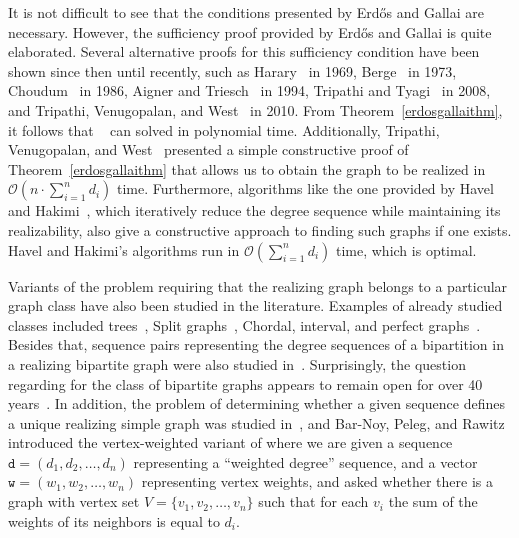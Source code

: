 It is not difficult to see that the conditions presented by Erd\H{o}s and Gallai are necessary. However, the sufficiency proof provided by Erd\H{o}s and Gallai is quite elaborated. Several alternative proofs for this sufficiency condition have been shown since then until recently, such as Harary~\cite{harary1969graph} in 1969, Berge~\cite{berge1973graphs} in 1973,  Choudum~\cite{choudum1986simple} in 1986, Aigner and Triesch~\cite{aigner1994realizability} in 1994, Tripathi and Tyagi~\cite{tripathi2008simple} in 2008, and Tripathi, Venugopalan, and West~\cite{tripathi2010short} in 2010. 
%
From Theorem~\ref{erdosgallaithm}, it follows that \GRfull~ can solved in polynomial time. Additionally, Tripathi, Venugopalan, and West~\cite{tripathi2010short} presented a simple constructive proof of Theorem~\ref{erdosgallaithm} that allows us to obtain the graph to be realized in $\mathcal{O}(n\cdot \sum_{i=1}^n d_i)$ time.
Furthermore, algorithms like the one provided by Havel and Hakimi~\cite{Ha55,Ha62}, which iteratively reduce the degree sequence while maintaining its realizability, also give a constructive approach to finding such graphs if one exists. Havel and Hakimi's algorithms run in
$\mathcal{O}(\sum_{i=1}^n d_i)$ time, which is optimal.

Variants of the \GRfull{} problem requiring that the realizing graph belongs to a particular graph class have also been studied in the literature. Examples of already studied classes included trees~\cite{gupta2007graphic}, 
Split graphs~\mbox{\cite{hammer1981splittance,chat2014recognition}}, Chordal, interval, and perfect graphs~\cite{chernyak1987forcibly}. Besides that, sequence pairs representing the degree sequences of a bipartition in a realizing bipartite graph were also studied in~\cite{burstein2017sufficient}. Surprisingly, the question regarding \GRfull{} for the class of bipartite graphs appears to remain open for over 40 years~\mbox{\cite{bar2022realizing,rao2006survey}}. 
In addition, the problem of determining whether a given sequence defines a unique realizing simple graph was studied in~\cite{aigner1994realizability,KOREN1976235,pak2013constructing}, and Bar-Noy, Peleg, and Rawitz~\cite{bar2020vertex} introduced the vertex-weighted variant of \GRfull{} where we are given a sequence $\texttt{d}=(d_1,d_2,\ldots,d_n)$ representing a ``weighted degree'' sequence, and a vector $\texttt{w}=(w_1,w_2,\ldots,w_n)$ representing vertex weights, and asked whether there is a graph with vertex set $V=\{v_1,v_2,\ldots,v_n\}$ such that for each $v_i$ the sum of the weights of its neighbors is equal to $d_i$. 

